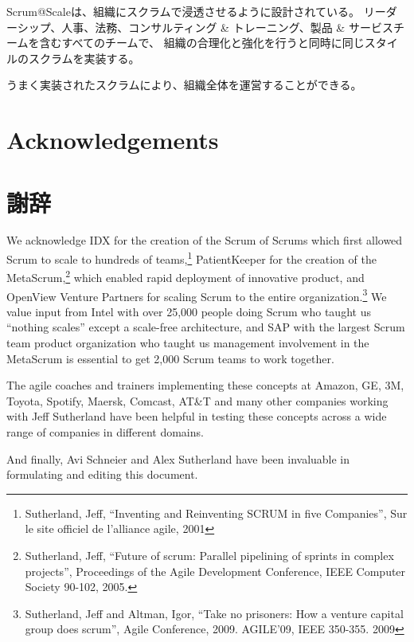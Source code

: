 \documentclass[12pt,a4paper,parskip=full]{scrartcl}
\begin{document}
Scrum@Scaleは、組織にスクラムで浸透させるように設計されている。
リーダーシップ、人事、法務、コンサルティング \& トレーニング、製品 \& サービスチームを含むすべてのチームで、
組織の合理化と強化を行うと同時に同じスタイルのスクラムを実装する。

うまく実装されたスクラムにより、組織全体を運営することができる。
\section{Acknowledgements}
\fi
\section{謝辞}
We acknowledge IDX for the creation of the Scrum of Scrums which first
allowed Scrum to scale to hundreds of teams,\footnote{Sutherland, Jeff,
``Inventing and Reinventing SCRUM in five Companies'', Sur le site officiel
de l'alliance agile, 2001} PatientKeeper for the creation of the
MetaScrum,\footnote{Sutherland, Jeff, ``Future of scrum: Parallel pipelining
of sprints in complex projects'', Proceedings of the Agile Development
Conference,  IEEE Computer Society 90-102,  2005.} which enabled rapid
deployment of innovative product, and OpenView Venture Partners for scaling
Scrum to the entire organization.\footnote{Sutherland, Jeff and Altman,
Igor, ``Take no prisoners: How a venture capital group does scrum'', Agile
Conference, 2009. AGILE'09, IEEE 350-355.  2009} We value input from Intel
with over 25,000 people doing Scrum who taught us ``nothing scales'' except
a scale-free architecture, and SAP with the largest Scrum team product
organization who taught us management involvement in the MetaScrum is
essential to get 2,000 Scrum teams to work together.

The agile coaches and trainers implementing these concepts at Amazon, GE,
3M, Toyota, Spotify, Maersk, Comcast, AT\&T and many other companies working with Jeff Sutherland
have been helpful in testing these concepts across a wide range of
companies in different domains.

And finally, Avi Schneier and Alex Sutherland have been invaluable in
formulating and editing this document.

\pagebreak

\printbibliography
\end{document}
